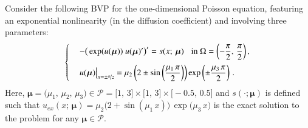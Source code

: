 \documentclass{elsarticle}
\numberwithin{equation}{section}
\theoremstyle{theorem}
\theoremstyle{definition}
\theoremstyle{remark}
\theoremstyle{proposition}
\numberwithin{figure}{section}
\newcommand{\bg}[1]{\boldsymbol{#1}}
\begin{document}
		Consider the following BVP for the one-dimensional Poisson equation, featuring an exponential nonlinearity (in the diffusion coefficient) and involving three parameters:
		\begin{equation}
			\label{eq:poisson1d}
			\begin{cases}
				& - \big( \exp(u(\bg{\mu})) ~ u(\bg{\mu})' \big)' = s(x; \, \bg{\mu}) \hspace*{0.3cm} \text{in $\Omega = \left( -\dfrac{\pi}{2}, \, \dfrac{\pi}{2} \right)$} \, , \\[0.3cm]
				& u(\bg{\mu}) \big|_{x = \pm \nicefrac{\pi}{2}} = \mu_2 \left( 2 \pm \sin\left( \dfrac{\mu_1 \, \pi}{2} \right) \right) \exp \left( \pm \dfrac{\mu_3 \, \pi}{2} \right) \, .
			\end{cases}
		\end{equation}
		Here, $\bg{\mu} = \big(\mu_1, \, \mu_2, \, \mu_3 \big) \in \mathcal{P} = \big[ 1, \, 3 \big] \times \big[ 1, \, 3 \big] \times \big[ -0.5, \, 0.5 \big]$ and $s(\cdot; \bg{\mu})$ is defined such that $u_{ex}(x; \, \bg{\mu}) = \mu_2 \big( 2 + \sin(\mu_1 \, x) \big) \, \exp \big( \mu_3 \, x \big)$ is the exact solution to the problem for any $\bg{\mu} \in \mathcal{P}$. 
		
		
\end{document}
